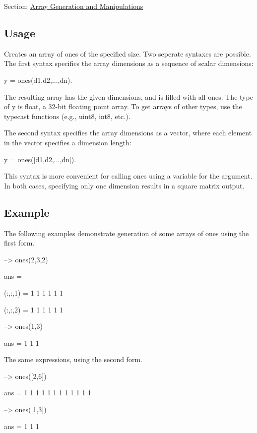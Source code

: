 Section\-: \hyperlink{sec_array}{Array Generation and Manipulations} \hypertarget{vtkwidgets_vtkxyplotwidget_Usage}{}\subsection{Usage}\label{vtkwidgets_vtkxyplotwidget_Usage}
Creates an array of ones of the specified size. Two seperate syntaxes are possible. The first syntax specifies the array dimensions as a sequence of scalar dimensions\-: \begin{DoxyVerb}   y = ones(d1,d2,...,dn).
\end{DoxyVerb}
 The resulting array has the given dimensions, and is filled with all ones. The type of {\ttfamily y} is {\ttfamily float}, a 32-\/bit floating point array. To get arrays of other types, use the typecast functions (e.\-g., {\ttfamily uint8}, {\ttfamily int8}, etc.).

The second syntax specifies the array dimensions as a vector, where each element in the vector specifies a dimension length\-: \begin{DoxyVerb}   y = ones([d1,d2,...,dn]).
\end{DoxyVerb}
 This syntax is more convenient for calling {\ttfamily ones} using a variable for the argument. In both cases, specifying only one dimension results in a square matrix output. \hypertarget{variables_struct_Example}{}\subsection{Example}\label{variables_struct_Example}
The following examples demonstrate generation of some arrays of ones using the first form.


\begin{DoxyVerbInclude}
--> ones(2,3,2)

ans = 

(:,:,1) = 
 1 1 1 
 1 1 1 

(:,:,2) = 
 1 1 1 
 1 1 1 

--> ones(1,3)

ans = 
 1 1 1 
\end{DoxyVerbInclude}


The same expressions, using the second form.


\begin{DoxyVerbInclude}
--> ones([2,6])

ans = 
 1 1 1 1 1 1 
 1 1 1 1 1 1 

--> ones([1,3])

ans = 
 1 1 1 
\end{DoxyVerbInclude}


